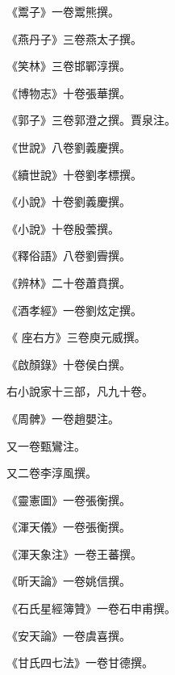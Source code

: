 \begin{pinyinscope}
 《鬻子》一卷鬻熊撰。



 《燕丹子》三卷燕太子撰。



 《笑林》三卷邯鄲淳撰。



 《博物志》十卷張華撰。



 《郭子》三卷郭澄之撰。賈泉注。



 《世說》八卷劉義慶撰。



 《續世說》十卷劉孝標撰。



 《小說》十卷劉義慶撰。



 《小說》十卷殷蕓撰。



 《釋俗語》八卷劉霽撰。



 《辨林》二十卷蕭賁撰。



 《酒孝經》一卷劉炫定撰。



 《
 座右方》三卷庾元威撰。



 《啟顏錄》十卷侯白撰。



 右小說家十三部，凡九十卷。



 《周髀》一卷趙嬰注。



 又一卷甄鸞注。



 又二卷李淳風撰。



 《靈憲圖》一卷張衡撰。



 《渾天儀》一卷張衡撰。



 《渾天象注》一卷王蕃撰。



 《昕天論》一卷姚信撰。



 《石氏星經簿贊》一卷石申甫撰。



 《安天論》一卷虞喜撰。



 《甘氏四七法》一卷甘德撰。




\end{pinyinscope}
